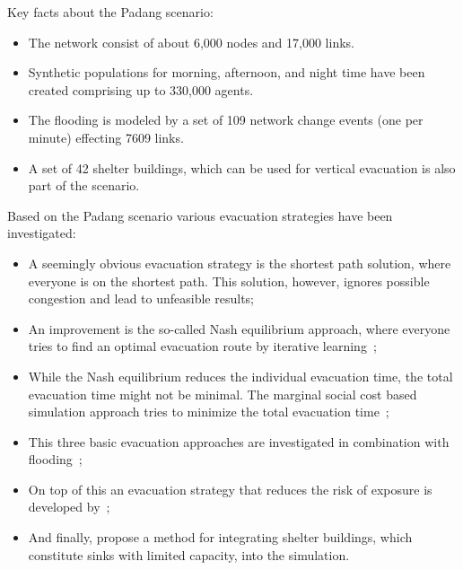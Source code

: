 Key facts about the Padang scenario:
\begin{itemize}
\item The network consist of about 6,000 nodes and 17,000 links.
\item Synthetic populations for morning, afternoon, and night time have been created comprising up to 330,000 agents.
\item The flooding is modeled by a set of 109 network change events (one per minute) effecting 7609 links.
\item A set of 42 shelter buildings, which can be used for vertical evacuation is also part of the scenario.
\end{itemize}
Based on the Padang scenario various evacuation strategies have been investigated:
\begin{itemize}
\item A seemingly obvious evacuation strategy is the shortest path solution, where everyone is on the shortest path. This solution, however, ignores possible congestion and lead to unfeasible results;
\item  An improvement is the so-called Nash equilibrium approach, where everyone tries to find an optimal evacuation route by iterative learning~\citep{LaemmelKluepfelNagel2009EvacPadangAtBookTimmermanns};
\item While the Nash equilibrium reduces the individual evacuation time, the total evacuation time might not be minimal. The marginal social cost based simulation approach tries to minimize the total evacuation time~\citep{LaemmelFloetteroed_MertschingEtAl_2009,DresslerFloetteroedLaemmelNagelSkutella2010OptimalEvacuationLargeScaleScenarios};
\item This three basic evacuation approaches are investigated in combination with flooding~\citep{LaemmelEtAl_TransResC_2010,Laemmel_PhDThesis_2011};
\item On top of this an evacuation strategy that reduces the risk of exposure is developed by~\citep{LaemmelKluepfelNagel2010PEDRiskPrinted};
\item And finally, \citet{FloetteroedLaemmel2010ICECShelterEvac} propose a method for integrating shelter buildings, which constitute sinks with limited capacity, into the simulation.  
\end{itemize}
